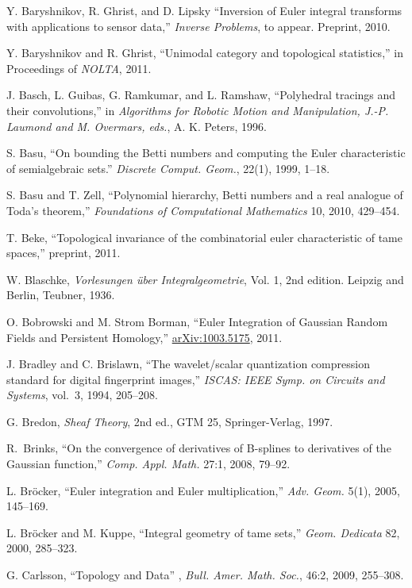 \documentclass{psapm-l}
\theoremstyle{definition}
\theoremstyle{remark}
\numberwithin{equation}{section}
\begin{document}
{\begin{thebibliography}{A}
 Y. Baryshnikov, R. Ghrist, and D. Lipsky ``Inversion of Euler integral transforms with applications to sensor data,'' {\em Inverse Problems}, to appear. Preprint, 2010.

 Y. Baryshnikov and R. Ghrist, ``Unimodal category and topological statistics,'' in Proceedings of {\em NOLTA}, 2011.

 J. Basch, L. Guibas, G. Ramkumar, and L. Ramshaw, ``Polyhedral tracings and their convolutions,'' in {\em Algorithms for Robotic Motion and Manipulation, J.-P. Laumond and M. Overmars, eds.}, A. K. Peters, 1996.

 S. Basu, ``On bounding the Betti numbers and computing the Euler characteristic of semialgebraic sets.'' {\em Discrete Comput. Geom.}, 22(1), 1999, 1--18.

 S. Basu and T. Zell, ``Polynomial hierarchy, Betti numbers and a real analogue of Toda's theorem,'' {\em Foundations of Computational Mathematics} 10, 2010, 429--454.

 T. Beke, ``Topological invariance of the combinatorial euler characteristic of tame spaces,'' preprint, 2011.

 W. Blaschke, {\em Vorlesungen \"uber Integralgeometrie}, Vol. 1, 2nd edition. Leipzig and Berlin, Teubner, 1936.

 O. Bobrowski and M. Strom Borman, ``Euler Integration of Gaussian Random Fields and Persistent Homology,'' \url{arXiv:1003.5175}, 2011.

 J. Bradley and C. Brislawn, ``The wavelet/scalar quantization compression standard for digital fingerprint images,'' {\em ISCAS: IEEE Symp. on Circuits and Systems}, vol.~3, 1994, 205--208.

 G. Bredon, {\em Sheaf Theory}, 2nd ed., GTM 25, Springer-Verlag, 1997.

 R.~Brinks, ``On the convergence of derivatives of B-splines to derivatives of the Gaussian function,'' {\em Comp. Appl. Math.} 27:1, 2008, 79--92.

 L. Br\"ocker, ``Euler integration and Euler multiplication,'' {\em  Adv. Geom.} 5(1), 2005, 145--169.

 L. Br\"ocker and M. Kuppe, ``Integral geometry of tame sets,'' {\em Geom. Dedicata} 82, 2000, 285--323.

 G. Carlsson, ``Topology and Data'' , {\em Bull. Amer. Math. Soc.}, 46:2, 2009, 255--308.


\end{thebibliography}}
\end{document}
